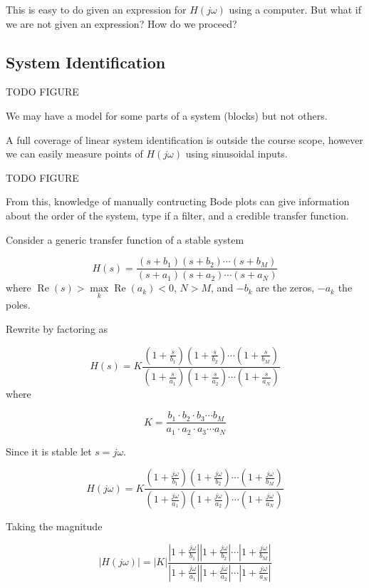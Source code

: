 \documentclass{article}
\begin{document}
This is easy to do given an expression for $H(j\omega)$ using a computer. But what if we are not given an expression? How do we proceed?

\subsection{System Identification}

TODO FIGURE

We may have a model for some parts of a system (blocks) but not others.

A full coverage of linear system identification is outside the course scope, however we can easily measure points of $H(j\omega)$ using sinusoidal inputs.

TODO FIGURE

From this, knowledge of manually contructing Bode plots can give information about the order of the system, type if a filter, and a credible transfer function.

Consider a generic transfer function of a stable system

\[
H(s)=\frac{\left(s+b_{1}\right)\left(s+b_{2}\right) \cdots\left(s+b_{M}\right)}{\left(s+a_{1}\right)\left(s+a_{2}\right) \cdots\left(s+a_{N}\right)}
\]
where $\operatorname{Re}(s)>\max\limits_k \operatorname{Re}(a_k) < 0$, $N>M$, and  $-b_{k}$ are the zeros, $-a_{k}$ the poles.

Rewrite by factoring as

\[
H(s)=K \frac{\left(1+\frac{s}{b_{1}}\right)\left(1+\frac{s}{b_{2}}\right)\cdots\left(1+\frac{s}{b_{M}}\right)}{\left(1+\frac{s}{a_{1}}\right)\left(1+\frac{s}{a_{2}}\right)\cdots \left(1+\frac{s}{a_{N}}\right)}
\]
where

\[
K = \frac{b_1\cdot b_2\cdot b_3 \cdots b_M}{a_1\cdot a_2\cdot a_3 \cdots a_N}
\]

Since it is stable let $s=j\omega$.

\[
H(j\omega)=K \frac{\left(1+\frac{j\omega}{b_{1}}\right)\left(1+\frac{j\omega}{b_{2}}\right)\cdots\left(1+\frac{j\omega}{b_{M}}\right)}{\left(1+\frac{j\omega}{a_{1}}\right)\left(1+\frac{j\omega}{a_{2}}\right)\cdots \left(1+\frac{j\omega}{a_{N}}\right)}
\]

Taking the magnitude

\[
\left|H(j\omega)\right|=\left|K\right| \frac{\left|1+\frac{j\omega}{b_{1}}\right|\left|1+\frac{j\omega}{b_{2}}\right|\cdots\left|1+\frac{j\omega}{b_{M}}\right|}{\left|1+\frac{j\omega}{a_{1}}\right|\left|1+\frac{j\omega}{a_{2}}\right|\cdots \left|1+\frac{j\omega}{a_{N}}\right|}
\]
\end{document}

